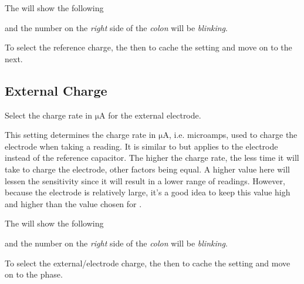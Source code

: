 The  will show the following


and the number on the \textit{right} side of the \textit{colon} will be
\textit{blinking}.

\par\medskip

To select the reference charge,  the  then  to cache the
setting and move on to the next.


\subsection{External Charge} 

Select the charge rate in $\mathrm{\mu A}$ for the external electrode.

\par\medskip

This setting determines the charge rate in $\mathrm{\mu A}$, i.e. microamps,
used to charge the electrode when taking a reading.  It is similar to 
but applies to the electrode instead of the reference capacitor.  The higher
the charge rate, the less time it will take to charge the electrode, other
factors being equal.  A higher value here will lessen the sensitivity since it
will result in a lower range of readings.  However, because the electrode is
relatively large, it's a good idea to keep this value high and higher than the
value chosen for .

\par\medskip

The  will show the following


and the number on the \textit{right} side of the \textit{colon} will be
\textit{blinking}.

\par\medskip

To select the external\slash electrode charge,  the  then 
to cache the setting and move on to the \hyperref[Touch Calibration]{}
phase.

